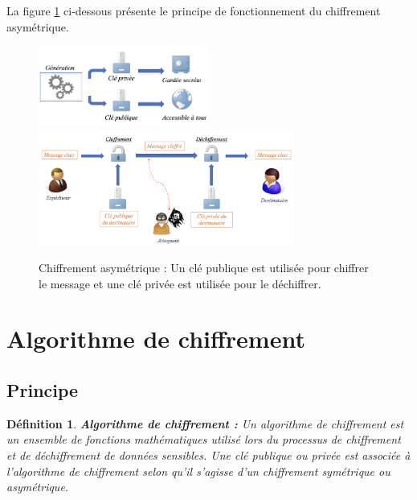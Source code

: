 \documentclass[oneside]{book}
\newtheorem{definition}{Définition}[section]
\begin{document}
\hspace{-0.5cm}La figure \ref{fig:asymétrique} ci-dessous présente le principe de fonctionnement du chiffrement asymétrique.

\begin{figure}[htbp]
    \centering
    \includegraphics[width=0.5\textwidth]{image/cle_asymetrique}
    \includegraphics[width=0.75\textwidth]{image/asymetrique}
    \caption{Chiffrement asymétrique : Un clé publique est utilisée pour chiffrer le message et une clé privée est utilisée pour le déchiffrer.}
    \label{fig:asymétrique}
\end{figure}

\newpage
\section{Algorithme de chiffrement}
\label{sec:algo}

\subsection{Principe}
\label{sec:Introduction}

\theoremstyle{definition}
\begin{definition}{\textbf{Algorithme de chiffrement :}}
Un algorithme de chiffrement est un ensemble de fonctions mathématiques utilisé lors du processus de chiffrement et de déchiffrement de données sensibles. Une clé publique ou privée est associée à l'algorithme de chiffrement selon qu'il s'agisse d'un chiffrement symétrique ou asymétrique.
\end{definition}
\end{document}

